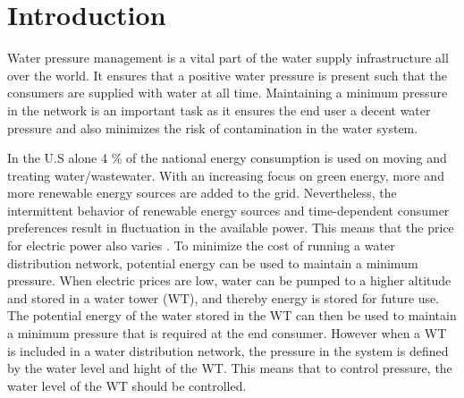 \chapter{Introduction}
\label{introduction}

Water pressure management is a vital part of the water supply infrastructure all over the world. It ensures that a positive water pressure is present such that the consumers are supplied with water at all time. Maintaining a minimum pressure in the network is an important task as it ensures the end user a decent water pressure and also minimizes the risk of contamination in the water system\cite{national2005public}.

In the U.S alone 4 \% of the national energy consumption is used on moving and treating water/wastewater\cite{appelbaum2002water}. %
%
%
With an increasing focus on green energy, more and more renewable energy sources are added to the grid. Nevertheless, the intermittent behavior of renewable energy sources and time-dependent consumer preferences result in fluctuation in the available power.
This means that the price for electric power also varies \cite{fluctuating_price}. To minimize the cost of running a water distribution network, potential energy can be used to maintain a minimum pressure. When electric prices are low, water can be pumped to a higher altitude and stored in a water tower (WT), and thereby energy is stored for future use. The potential energy of the water stored in the WT can then be used to maintain a minimum pressure that is required at the end consumer. However when a WT is included in a water distribution network, the pressure in the system is defined by the water level and hight of the WT. This means that to control pressure, the water level of the WT should be controlled.  


